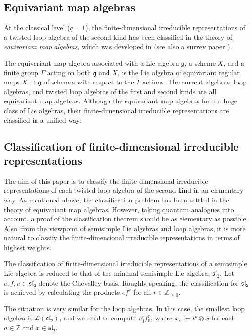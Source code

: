 \documentclass[12pt,a4paper]{amsart}
\theoremstyle{definition}
\numberwithin{equation}{subsection}
\begin{document}
\subsection{Equivariant map algebras}
At the classical level ($q = 1$), the finite-dimensional irreducible representations of a twisted loop algebra of the second kind has been classified in the theory of \emph{equivariant map algebras}, which was developed in \cite{NSS12} (see also a survey paper \cite{NeSa13}).

The equivariant map algebra associated with a Lie algebra $\mathfrak{g}$, a scheme $X$, and a finite group $\Gamma$ acting on both $\mathfrak{g}$ and $X$, is the Lie algebra of equivariant regular maps $X \to \mathfrak{g}$ of schemes with respect to the $\Gamma$-actions.
The current algebras, loop algebras, and twisted loop algebras of the first and second kinds are all equivariant map algebras.
Although the equivariant map algebras form a huge class of Lie algebras, their finite-dimensional irreducible representations are classified in a unified way.


\subsection{Classification of finite-dimensional irreducible representations}
The aim of this paper is to classify the finite-dimensional irreducible representations of each twisted loop algebra of the second kind in an elementary way.
As mentioned above, the classification problem has been settled in the theory of equivariant map algebras.
However, taking quantum analogues into account, a proof of the classification theorem should be as elementary as possible.
Also, from the viewpoint of semisimple Lie algebras and loop algebras, it is more natural to classify the finite-dimensional irreducible representations in terms of highest weights.

The classification of finite-dimensional irreducible representations of a semisimple Lie algebra is reduced to that of the minimal semisimple Lie algebra; $\mathfrak{sl}_2$.
Let $e,f,h \in \mathfrak{sl}_2$ denote the Chevalley basis.
Roughly speaking, the classification for $\mathfrak{sl}_2$ is achieved by calculating the products $e f^r$ for all $r \in \mathbb{Z}_{\geq 0}$.

The situation is very similar for the loop algebras.
In this case, the smallest loop algebra is $\mathcal{L}(\mathfrak{sl}_2)$, and we need to compute $e_1^r f_0^r$, where $x_a := t^a \otimes x$ for each $a \in \mathbb{Z}$ and $x \in \mathfrak{sl}_2$.
\end{document}
